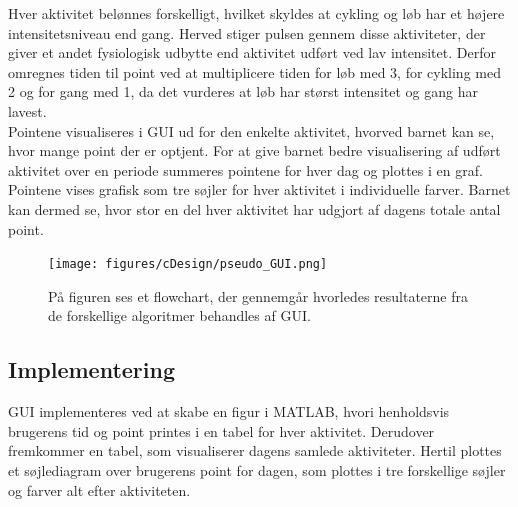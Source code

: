 Hver aktivitet belønnes forskelligt, hvilket skyldes at cykling og løb har et højere intensitetsniveau end gang. Herved stiger pulsen gennem disse aktiviteter, der giver et andet fysiologisk udbytte end aktivitet udført ved lav intensitet. Derfor omregnes tiden til point ved at multiplicere tiden for løb med 3, for cykling med 2 og for gang med 1, da det vurderes at løb har størst intensitet og gang har lavest.\\ 
Pointene visualiseres i GUI ud for den enkelte aktivitet, hvorved barnet kan se, hvor mange point der er optjent. For at give barnet bedre visualisering af udført aktivitet over en periode summeres pointene for hver dag og plottes i en graf. Pointene vises grafisk som tre søjler for hver aktivitet i individuelle farver. Barnet kan dermed se, hvor stor en del hver aktivitet har udgjort af dagens totale antal point.  
\begin{figure}[H]
	\centering
	\texttt{[image: figures/cDesign/pseudo\_GUI.png]}
	\caption{På figuren ses et flowchart, der gennemgår hvorledes resultaterne fra de forskellige algoritmer behandles af GUI.}
	\label{fig:GUI}
\end{figure}\vspace{-.25cm}

\subsection{Implementering}
GUI implementeres ved at skabe en figur i MATLAB, hvori henholdsvis brugerens tid og point printes i en tabel for hver aktivitet. Derudover fremkommer en tabel, som visualiserer dagens samlede aktiviteter. Hertil plottes et søjlediagram over brugerens point for dagen, som plottes i tre forskellige søjler og farver alt efter aktiviteten.

